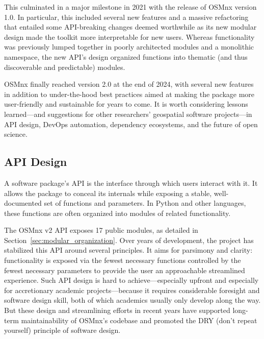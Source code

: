 \documentclass[12pt,letterpaper]{article} %
\begin{document}
This culminated in a major milestone in 2021 with the release of OSMnx version 1.0. In particular, this included several new features and a massive refactoring that entailed some API-breaking changes deemed worthwhile as its new modular design made the toolkit more interpretable for new users. Whereas functionality was previously lumped together in poorly architected modules and a monolithic namespace, the new API's design organized functions into thematic (and thus discoverable and predictable) modules.

OSMnx finally reached version 2.0 at the end of 2024, with several new features in addition to under-the-hood best practices aimed at making the package more user-friendly and sustainable for years to come. It is worth considering lessons learned---and suggestions for other researchers' geospatial software projects---in API design, DevOps automation, dependency ecosystems, and the future of open science.

\subsection{API Design}

A software package's API is the interface through which users interact with it. It allows the package to conceal its internals while exposing a stable, well-documented set of functions and parameters. In Python and other languages, these functions are often organized into modules of related functionality.

The OSMnx v2 API exposes 17 public modules, as detailed in Section~\ref{sec:modular_organization}. Over years of development, the project has stabilized this API around several principles. It aims for parsimony and clarity: functionality is exposed via the fewest necessary functions controlled by the fewest necessary parameters to provide the user an approachable streamlined experience. Such API design is hard to achieve---especially upfront and especially for accretionary academic projects---because it requires considerable foresight and software design skill, both of which academics usually only develop along the way. But these design and streamlining efforts in recent years have supported long-term maintainability of OSMnx's codebase and promoted the DRY (don't repeat yourself) principle of software design.
\end{document}

